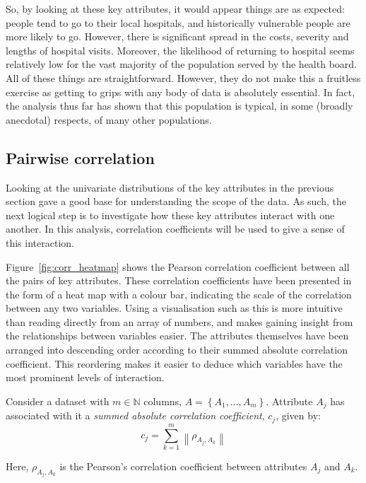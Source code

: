 So, by looking at these key attributes, it would appear things are as expected:
people tend to go to their local hospitals, and historically vulnerable people
are more likely to go. However, there is significant spread in the costs,
severity and lengths of hospital visits. Moreover, the likelihood of returning
to hospital seems relatively low for the vast majority of the population served
by the health board. All of these things are straightforward. However, they do
not make this a fruitless exercise as getting to grips with any body of data is
absolutely essential. In fact, the analysis thus far has shown that this
population is typical, in some (broadly anecdotal) respects, of many other
populations.


\subsection{Pairwise correlation}\label{subsec:corr}

Looking at the univariate distributions of the key attributes in the previous
section gave a good base for understanding the scope of the data. As such, the
next logical step is to investigate how these key attributes interact with one
another. In this analysis, correlation coefficients will be used to give a sense
of this interaction.

Figure~\ref{fig:corr_heatmap} shows the Pearson correlation coefficient between
all the pairs of key attributes. These correlation coefficients have been
presented in the form of a heat map with a colour bar, indicating the scale of
the correlation between any two variables. Using a visualisation such as this is
more intuitive than reading directly from an array of numbers, and makes gaining
insight from the relationships between variables easier. The attributes
themselves have been arranged into descending order according to their summed
absolute correlation coefficient. This reordering makes it easier to deduce
which variables have the most prominent levels of interaction.

\begin{definition}
    Consider a dataset with \(m \in \mathbb{N}\) columns,
    \(A = \left\{A_1, \ldots, A_m\right\}\). Attribute \(A_j\) has
    associated with it a \emph{summed absolute correlation coefficient},
    \(c_j\), given by:
    \begin{equation}\label{eq:abs_corr}
        c_j = \sum_{k=1}^{m} \left\| \rho_{A_j, A_k} \right\|
    \end{equation}

    Here, \(\rho_{A_j, A_k}\) is the Pearson's correlation coefficient
    between attributes \(A_j\) and \(A_k\).
\end{definition}

